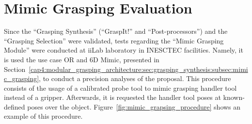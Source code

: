 \section{Mimic Grasping Evaluation}
\label{cap5:mimic_grasping_evaluation}

Since the ``Grasping Synthesis'' (``GraspIt!'' and ``Post-processors'') and the ``Grasping Selection'' were validated, tests regarding the ``Mimic Grasping Module''  were conducted at iiLab laboratory in INESCTEC facilities. Namely, it is used the use case \ac{OR} and 6D Mimic, presented in Section~\ref{cap4:modular_grasping_architecture:sec:grasping_synthesis:subsec:mimic_grasping}, to conduct a precision analyses of the proposal. This procedure consists of the usage of a calibrated probe tool to mimic grasping handler tool instead of a gripper. Afterwards, it is requested the handler tool poses at known-defined poses over the object. Figure~\ref{fig:mimic_grapsing_procedure} shows an example of this procedure. 


